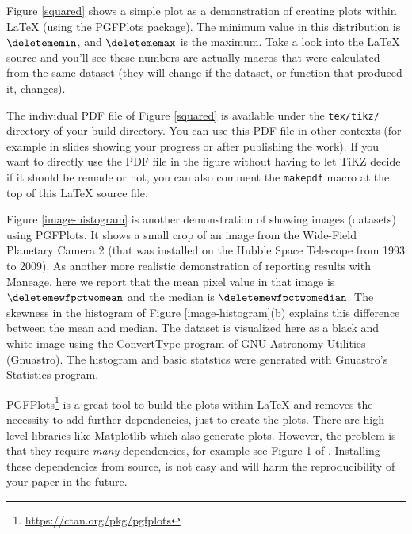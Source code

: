 \documentclass[10pt, twocolumn]{article}
\begin{document}
Figure \ref{squared} shows a simple plot as a demonstration of creating plots within \LaTeX{} (using the {\small PGFP}lots package).
The minimum value in this distribution is $\deletememin$, and $\deletememax$ is the maximum.
Take a look into the \LaTeX{} source and you'll see these numbers are actually macros that were calculated from the same dataset (they will change if the dataset, or function that produced it, changes).

The individual {\small PDF} file of Figure \ref{squared} is available under the \texttt{tex/tikz/} directory of your build directory.
You can use this PDF file in other contexts (for example in slides showing your progress or after publishing the work).
If you want to directly use the {\small PDF} file in the figure without having to let {\small T}i{\small KZ} decide if it should be remade or not, you can also comment the \texttt{makepdf} macro at the top of this \LaTeX{} source file.

\begin{figure}[t]

\end{figure}

Figure \ref{image-histogram} is another demonstration of showing images (datasets) using PGFPlots.
It shows a small crop of an image from the Wide-Field Planetary Camera 2 (that was installed on the Hubble Space Telescope from 1993 to 2009).
As another more realistic demonstration of reporting results with Maneage, here we report that the mean pixel value in that image is $\deletemewfpctwomean$ and the median is $\deletemewfpctwomedian$.
The skewness in the histogram of Figure \ref{image-histogram}(b) explains this difference between the mean and median.
The dataset is visualized here as a black and white image using the \textsf{Convert\-Type} program of GNU Astronomy Utilities (Gnuastro).
The histogram and basic statstics were generated with Gnuastro's \textsf{Statistics} program.

{\small PGFP}lots\footnote{\url{https://ctan.org/pkg/pgfplots}} is a great tool to build the plots within \LaTeX{} and removes the necessity to add further dependencies, just to create the plots.
There are high-level libraries like Matplotlib which also generate plots.
However, the problem is that they require \emph{many} dependencies, for example see Figure 1 of \citet{alliez19}.
Installing these dependencies from source, is not easy and will harm the reproducibility of your paper in the future.
\end{document}
